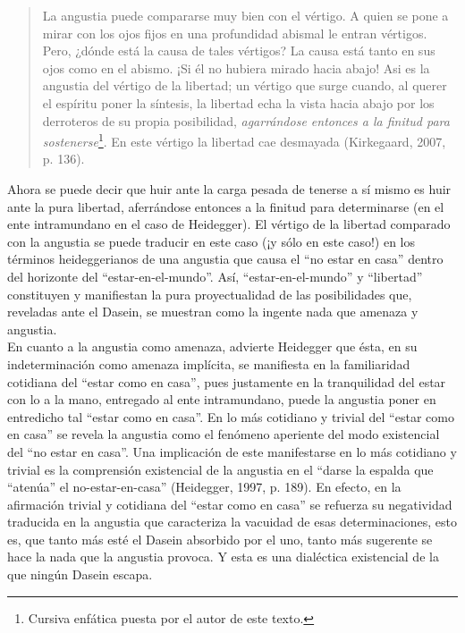 \begin{refsection}
\begin{quote}
\vspace{-1em}La angustia puede compararse muy bien con el vértigo. A quien se pone a mirar con los ojos fijos en una profundidad abismal le entran vértigos. Pero, ¿dónde está la causa de tales vértigos? La causa está tanto en sus ojos como en el abismo. ¡Si él no hubiera mirado hacia abajo! Asi es la angustia del vértigo de la libertad; un vértigo que surge cuando, al querer el espíritu poner la síntesis, la libertad echa la vista hacia abajo por los derroteros de su propia posibilidad, \emph{agarrándose entonces a la finitud para sostenerse}\footnote{Cursiva enfática puesta por el autor de este texto.}. En este vértigo la libertad cae desmayada (Kirkegaard, 2007, p. 136).
\end{quote}

\vspace{-1em}Ahora se puede decir que huir ante la carga pesada de tenerse a sí mismo es huir ante la pura libertad, aferrándose entonces a la finitud para determinarse (en el ente intramundano en el caso de Heidegger). El vértigo de la libertad comparado con la angustia se puede traducir en este caso (¡y sólo en este caso!) en los términos heideggerianos de una angustia que causa el ``no estar en casa'' dentro del horizonte del ``estar-en-el-mundo''. Así, ``estar-en-el-mundo'' y ``libertad'' constituyen y manifiestan la pura proyectualidad de las posibilidades que, reveladas ante el Dasein, se muestran como la ingente nada que amenaza y angustia.\\[-2em]

En cuanto a la angustia como amenaza, advierte Heidegger que ésta, en su indeterminación como amenaza implícita, se manifiesta en la familiaridad cotidiana del ``estar como en casa'', pues justamente en la tranquilidad del estar con lo a la mano, entregado al ente intramundano, puede la angustia poner en entredicho tal ``estar como en casa''. En lo más cotidiano y trivial del ``estar como en casa'' se revela la angustia como el fenómeno aperiente del modo existencial del ``no estar en casa''. Una implicación de este manifestarse en lo más cotidiano y trivial es la comprensión existencial de la angustia en el ``darse la espalda que ``atenúa'' el no-estar-en-casa'' (Heidegger, 1997, p. 189). En efecto, en la afirmación trivial y cotidiana del ``estar como en casa'' se refuerza su negatividad traducida en la angustia que caracteriza la vacuidad de esas determinaciones, esto es, que tanto más esté el Dasein absorbido por el uno, tanto más sugerente se hace la nada que la angustia provoca. Y esta es una dialéctica existencial de la que ningún Dasein escapa.\\[-2em]


\end{refsection}

